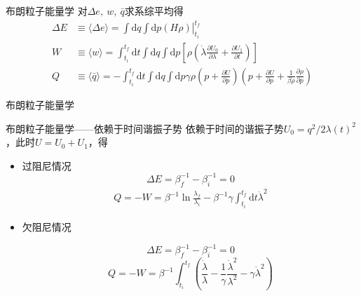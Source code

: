 \documentclass{beamer}
\newcommand{\M}[1]{\mathrm{#1}}
\newcommand{\PP}[2]{\frac{\partial #1}{\partial #2}}
\begin{document}
\begin{frame}{布朗粒子能量学}
对$\Delta e,\ w ,\ \bar{q}$求系综平均得
\begin{align}
    \Delta E &\equiv \langle\Delta e\rangle=\left.\int \M{d} q \int \M{d} p(H \rho)\right|_{t_{i}} ^{t_{f}}\\
    W &\equiv\langle w\rangle=\int_{t_{i}}^{t_{f}} \M{d} t \int \M{d} q \int \M{d} p \left[ \rho\left( \dot{\lambda} \frac{\partial U_0}{\partial \lambda} + \PP{U_1}{t} \right)\right] 
    \\
    Q&\equiv\langle \bar{q}\rangle=-\int_{t_i}^{t_f} \mathrm{d} t \int \mathrm{d} q \int \mathrm{d} p \gamma \rho\left(p+\frac{\partial U}{\partial p}\right)\left(p+\frac{\partial U}{\partial p}+\frac{1}{\beta \rho} \frac{\partial \rho}{\partial p}\right)  
    \label{eq3.12}
\end{align} 
\end{frame}

\begin{frame}{布朗粒子能量学}
\begin{alertblock}{布朗粒子能量学——依赖于时间谐振子势}
依赖于时间的谐振子势$U_0 = q^{2} / 2 \lambda(t)^2$，此时$U=U_0 + U_1$，得
\begin{itemize}
    \item<2-> 过阻尼情况
    \begin{equation}
        \Delta E = \beta_f^{-1} - \beta_i^{-1} =0
        \label{eq19}
    \end{equation}
    \begin{equation}
        \begin{split}
            Q = - W = \beta^{-1} \ln{\frac{\lambda_f}{\lambda_i}} - \beta^{-1} \gamma \int_{t_i}^{t_f} \mathrm{d} t    \dot{\lambda}^2 
        \end{split}
        \label{eq3.15}
    \end{equation}
    \item<3-> 欠阻尼情况
    
    \begin{equation}
        \Delta E = \beta_f^{-1} - \beta_i^{-1} =0
        \label{eq3.43}
    \end{equation}
    \begin{equation}
        Q =-W=\beta^{-1} \int_{t_i}^{t_f} \left(\frac{\dot{\lambda}}{\lambda}-\frac{1}{\gamma} \frac{\dot{\lambda}^{2}}{\lambda^{2}}-\gamma \dot{\lambda}^{2}\right)
        \label{eq3.44}
    \end{equation}
\end{itemize}
\end{alertblock}
\end{frame}
\end{document}
